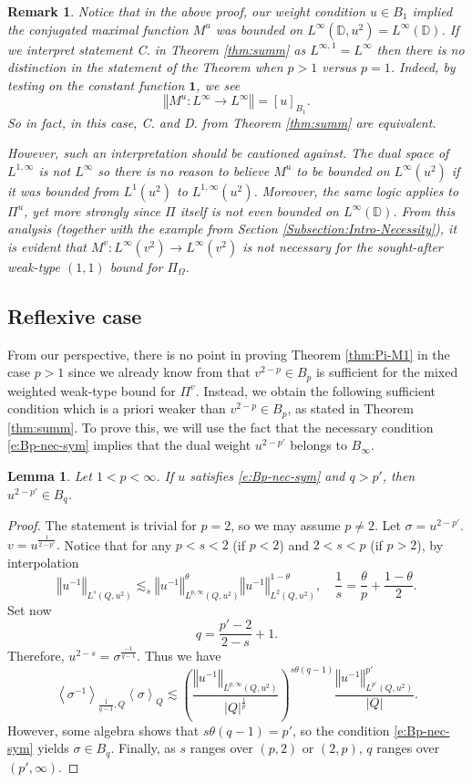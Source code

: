 \documentclass{amsart}
\newcommand{\norm}[1]{\left\Vert {#1}\right\Vert}
\newcommand{\avg}[1]{\left\langle {#1}\right\rangle}
\newtheorem{lemma}[theorem]{Lemma}
\newtheorem{remark}[theorem]{Remark}
\theoremstyle{definition}
\numberwithin{equation}{section}
\newcommand{\Piv}{\Pi^v}
\begin{document}
\begin{remark}\label{r:unified}
Notice that in the above proof, our weight condition $u \in B_1$ implied the conjugated maximal function $M^u$ was bounded on $L^\infty(\mathbb D,u^2) = L^\infty(\mathbb D)$. If we interpret statement C. in Theorem \ref{thm:summ} as $L^{\infty,1} = L^\infty$ then there is no distinction in the statement of the Theorem when $p >1$ versus $p=1$. Indeed, by testing on the constant function $\mathbf 1$, we see
    \[ \norm{ M^u \colon L^\infty \to L^\infty} = [u]_{B_1}.\]
So in fact, in this case, C. and D. from Theorem \ref{thm:summ} are equivalent.

However, such an interpretation should be cautioned against. The dual space of $L^{1,\infty}$ is not $L^\infty$ so there is no reason to believe $M^u$ to be bounded on $L^\infty(u^2)$ if it was bounded from $L^1(u^2)$ to $L^{1,\infty}(u^2)$. Moreover, the same logic applies to $\Pi^u$, yet more strongly since $\Pi$ itself is not even bounded on $L^\infty(\mathbb D)$. From this analysis (together with the example from Section \ref{Subsection:Intro-Necessity}), it is evident that $M^v\colon L^\infty(v^2) \to L^\infty(v^2)$ is not necessary for the sought-after weak-type $(1,1)$ bound for $\Pi_\Omega$.
\end{remark}

\subsection{Reflexive case}
From our perspective, there is no point in proving Theorem \ref{thm:Pi-M1} in the case $p>1$ since we already know from \cite{Bek86} that $v^{2-p} \in B_p$ is sufficient for the mixed weighted weak-type bound for $\Piv$. 
Instead, we obtain the following sufficient condition which is a priori weaker than $v^{2-p} \in B_p$, as stated in Theorem \ref{thm:summ}. To prove this, we will use the fact that the necessary condition \eqref{e:Bp-nec-sym}
implies that the dual weight $u^{2-p'}$ belongs to $B_\infty$.

\begin{lemma}\label{l:dual}
    Let $1 < p < \infty$. If $u$ satisfies \eqref{e:Bp-nec-sym} 
    and $q > p'$, then $u^{2-p'} \in B_q$. 
\end{lemma}
\begin{proof}
The statement is trivial for $p=2$, so we may assume $p \neq 2$. Let $\sigma = u^{2-p'}$. $v= u^{\frac{1}{2-p'}}.$ Notice that for any $p<s<2$ (if $p<2$) and $2<s<p$ (if $p>2$), by interpolation
    \[ \norm{u^{-1}}_{L^s(Q,u^2)} \lesssim_s \norm{u^{-1}}_{L^{p,\infty}(Q,u^2)}^\theta \norm{u^{-1}}_{L^2(Q,u^2)}^{1-\theta}, \quad \frac{1}{s} = \frac{\theta}{p} + \frac{1-\theta}{2}.\]
Set now
    \[ q= \frac{p'-2}{2-s}+1.\] 
Therefore, $u^{2-s} = \sigma^\frac{-1}{q-1}$. Thus we have
    \[ \avg{ \sigma^{-1}}_{\frac{1}{q-1},Q}\avg{\sigma}_Q 
     \lesssim \left( \frac{\norm{u^{-1}}_{L^{p,\infty}(Q,u^2)}}{|Q|^{\frac 1p}} \right)^{s\theta(q-1)}  \frac{\norm{u^{-1}}_{L^{p'}(Q,u^2)}^{p'}}{|Q|}.\]
However, some algebra shows that $s \theta(q-1) = p'$, so the condition \eqref{e:Bp-nec-sym} yields $\sigma \in B_q$. 
Finally, as $s$ ranges over $(p, 2)$ or $(2,p)$, $q$ ranges over $(p',\infty)$.
\end{proof}
\end{document}
